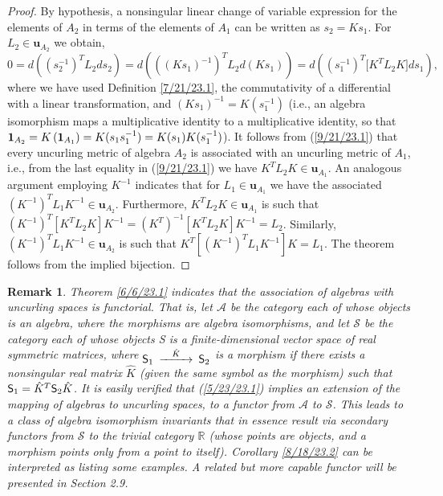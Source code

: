 \documentclass{amsart}
\numberwithin{equation}{section}
\newtheorem{remark}[theorem]{Remark}
\theoremstyle{definition}
\numberwithin{theorem}{section}
\begin{document}
\begin{proof} By hypothesis, a nonsingular linear change of variable expression for the elements of $A_2$ in terms of the elements of $A_1$ can be written as $s_2= Ks_1$. \mbox{For $L_2\in \mathbf{u}_{A_2}$} we obtain, \begin{equation} 0 = d\left((s_2^{-1})^T L_2 ds_2\right) =  d\left(((Ks_1)^{-1})^T L_2 d(Ks_1)\right) = d\left((s_1^{-1})^T \big[K^T L_2K\big]ds_1\right), \label{9/21/23.1}  \end{equation} where we have used Definition \ref{7/21/23.1}, the commutativity of a differential with a linear transformation, and $(Ks_1)^{-1} = K(s_1^{-1})$ (i.e., an algebra isomorphism maps a multiplicative identity to a multiplicative identity, so that ${\bf 1}_{A_2} = K\left(\mathbf{1}_{A_1}\right) = K(s_1s_1^{-1}) = K(s_1)K(s_1^{-1})$).  It follows from (\ref{9/21/23.1}) that every uncurling metric  of algebra $A_2$ is associated with an uncurling metric of $A_1$, i.e., from the last equality in (\ref{9/21/23.1}) we have  $K^TL_2K\in\mathbf{u}_{A_1}$.  An analogous argument employing $K^{-1}$ indicates that for $L_1\in\mathbf{u}_{A_1}$ we have the associated $(K^{-1})^T L_1 K^{-1} \in \mathbf{u}_{A_2}$.    Furthermore, $K^T L_2K\in\mathbf{u}_{A_1}$ is such that $(K^{-1})^T [K^T L_2 K]K^{-1} = (K^T)^{-1} [K^T L_2 K]K^{-1} = L_2$.  Similarly, $(K^{-1})^T L_1K^{-1}\in\mathbf{u}_{A_2}$ is such that $K^T[(K^{-1})^T L_1K^{-1}] K = L_1$.  The theorem follows from the implied bijection. 
\end{proof}

\begin{remark} \label{3/31/24.1} {\rm Theorem \ref{6/6/23.1} indicates that the association of algebras with uncurling spaces is functorial.  That is, let $\mathcal{A}$ be the category each of whose objects is an algebra, where the morphisms are algebra isomorphisms, and let $\mathcal{S}$ be the category each of whose objects {\sf S} is a finite-dimensional vector space of real symmetric matrices, where $\begin{CD}  {\sf S}_1 @>\hat{K}>> {\sf S}_2\end{CD}$ is a morphism if there exists a nonsingular real matrix $\hat{K}$ (given the same symbol as the morphism) such that \mbox{${\sf S}_1  = \hat{K}^T  {\sf S}_2 \hat{K}$.}  It is easily verified that (\ref{5/23/23.1}) implies an extension of the mapping of algebras to uncurling spaces, to a functor from $\mathcal{A}$ to $\mathcal{S}$.  This leads to a class of algebra isomorphism invariants that in essence result via secondary functors from $\mathcal{S}$ to the trivial category $\mathbb{R}$ (whose points are objects, and a morphism points only from a point to itself).  Corollary \ref{8/18/23.2} can be interpreted as listing some examples.  A related but more capable functor will be presented in Section 2.9.}\end{remark}
\end{document}
